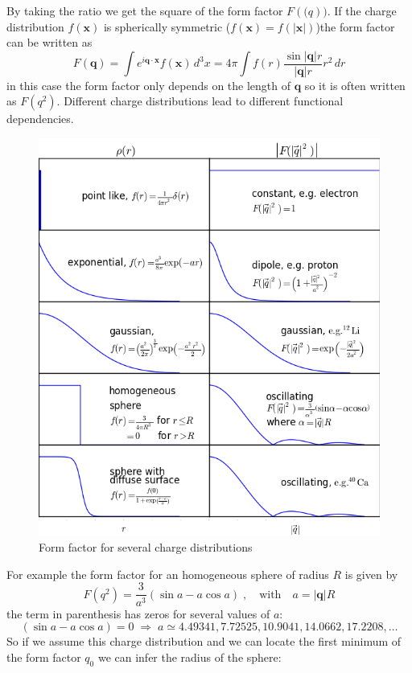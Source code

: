 \documentclass[12pt]{article}
\newcommand{\V}[1]{\mathbf{#1}}
\begin{document}
By taking the ratio we get the square of the form factor $F(\V(q))$. If the charge distribution $f(\V{x})$ is spherically symmetric ($f(\V{x})=f(|\V{x}|)$)the form factor can be written as
\[F(\V{q})=\int e^{i\V{q}\cdot\V{x}}f(\V{x})\,d^3x=4\pi\int f(r)\frac{\sin |\V{q}| r}{|\V{q}| r}r^2\,dr\]
in this case the form factor only depends on the length of $\V{q}$ so it is often written as $F(q^2)$. Different charge distributions lead to different functional dependencies.
\begin{figure}
\begin{center}
\includegraphics[scale=0.9]{images/form.png}
\end{center}
\caption{Form factor for several charge distributions}\label{fig:formFactor}
\end{figure} 
For example the form factor for an homogeneous sphere of radius $R$ is given by
\[F(q^2)=\frac{3}{a^3}\left(\sin a-a\cos a\right)\;,\quad\mbox{with}\quad a=|\V{q}|R\]
the term in parenthesis has zeros for several values of $a$:
\[\left(\sin a-a\cos a\right)=0\;\Rightarrow\;a\simeq 4.49341,7.72525,10.9041,14.0662,17.2208,\dots\]
So if we assume this charge distribution and we can locate the first minimum of the form factor $q_0$ we can infer the radius of the sphere:
\end{document}
